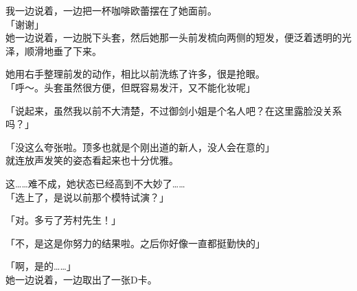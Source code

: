 我一边说着，一边把一杯咖啡欧蕾摆在了她面前。\\

「谢谢」\\

她一边说着，一边脱下头套，然后她那一头前发梳向两侧的短发，便泛着透明的光泽，顺滑地垂了下来。

她用右手整理前发的动作，相比以前洗练了许多，很是抢眼。\\

「呼～。头套虽然很方便，但既容易发汗，又不能化妆呢」

「说起来，虽然我以前不大清楚，不过御剑小姐是个名人吧？在这里露脸没关系吗？」

「没这么夸张啦。顶多也就是个刚出道的新人，没人会在意的」\\

就连放声发笑的姿态看起来也十分优雅。

这……难不成，她状态已经高到不大妙了……\\

「选上了，是说以前那个模特试演？」

「对。多亏了芳村先生！」

「不，是这是你努力的结果啦。之后你好像一直都挺勤快的」

「啊，是的……」\\

她一边说着，一边取出了一张D卡。\\

